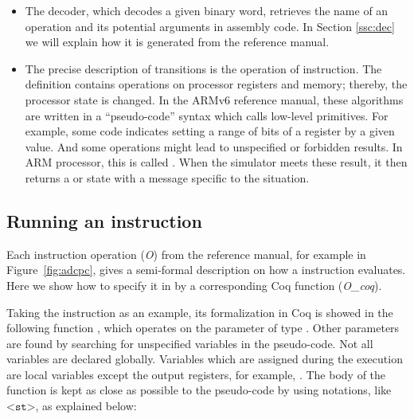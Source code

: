 \begin{itemize}
\item
  The decoder, which decodes a given binary word, retrieves the
  name of an operation and its potential arguments in assembly code.
  In Section \ref{ssc:dec} we will explain how it is generated from
  the reference manual.
\item
  The precise description of transitions is the operation of instruction.
  The definition contains operations on processor registers and memory;
  thereby, the processor state is changed.
  In the ARMv6 reference manual, these algorithms are written in
  a ``pseudo-code'' syntax which calls low-level primitives. For example,
  some code indicates setting a range of bits of a register by a given
  value. And some operations might lead to unspecified
  or forbidden results. In ARM processor, this is called \unpred. %
  When the simulator meets these result,
  it then returns a  or  state with
  a message specific to the situation.
\end{itemize}

\subsection{Running an instruction}
\label{ssec:fsmoa}

Each instruction operation (\textit{O}) from the reference manual,
for example in Figure~\ref{fig:adcpc}, gives a semi-formal
description on how a instruction evaluates.
Here we show how to specify it in by
a corresponding Coq function (\textit{O\_coq}).

Taking the instruction \adc as an example,
its formalization in Coq is showed in the following function
, which operates on the parameter 
of type \statedef. Other parameters are found by searching
for unspecified variables in the pseudo-code.
Not all variables are declared globally. Variables which are
assigned during the execution are local variables except the
output registers, for example, \Rd.
The body of the function is kept as close as possible to the pseudo-code
by using notations, like $\texttt{<st>}$, as explained below:

